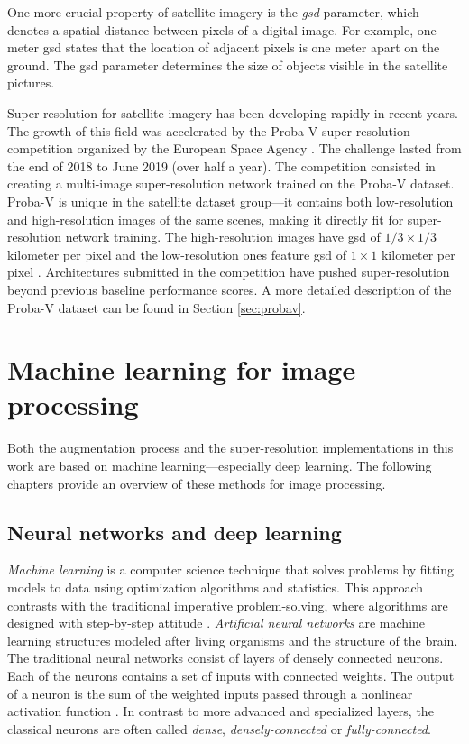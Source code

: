 One more crucial property of satellite imagery is the \textit{\gls{gsd}} parameter, which denotes a spatial distance between pixels of a digital image.
For example, one-meter \gls{gsd} states that the location of adjacent pixels is one meter apart on the ground.
The \gls{gsd} parameter determines the size of objects visible in the satellite pictures.

Super-resolution for satellite imagery has been developing rapidly in recent years.
The growth of this field was accelerated by the Proba-V super-resolution competition organized by the European Space Agency \cite{esa-proba-competition}.
The challenge lasted from the end of 2018 to June 2019 (over half a year).
The competition consisted in creating a multi-image super-resolution network trained on the Proba-V dataset.
Proba-V is unique in the satellite dataset group---it contains both low-resolution and high-resolution images of the same scenes, making it directly fit for super-resolution network training.
The high-resolution images have \gls{gsd} of $ 1/3 \times 1/3 $ kilometer per pixel and the low-resolution ones feature \gls{gsd} of $ 1 \times 1 $ kilometer per pixel \cite{direckx-2013-proba}.
Architectures submitted in the competition have pushed super-resolution beyond previous baseline performance scores.
A more detailed description of the Proba-V dataset can be found in Section \ref{sec:probav}.

\section{Machine learning for image processing}
\label{sec:machine-learning}
Both the augmentation process and the super-resolution implementations in this work are based on machine learning---especially deep learning.
The following chapters provide an overview of these methods for image processing.

\subsection{Neural networks and deep learning}
\label{sec:neural-nets}
\textit{Machine learning} is a computer science technique that solves problems by fitting models to data using optimization algorithms and statistics.
This approach contrasts with the traditional imperative problem-solving, where algorithms are designed with step-by-step attitude \cite{cholet-2018-deeplearning}.
\textit{Artificial neural networks} are machine learning structures modeled after living organisms and the structure of the brain.
The traditional neural networks consist of layers of densely connected neurons.
Each of the neurons contains a set of inputs with connected weights.
The output of a neuron is the sum of the weighted inputs passed through a nonlinear activation function \cite{bishop-2006-patternrecognition}.
In contrast to more advanced and specialized layers, the classical neurons are often called \textit{dense}, \textit{densely-connected} or \textit{fully-connected}.

